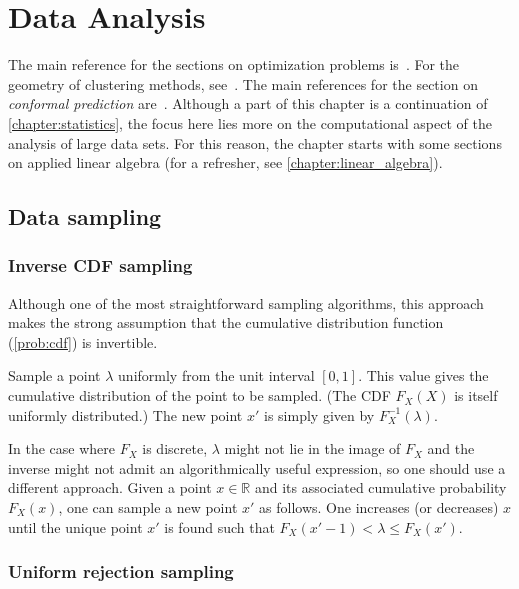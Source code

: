\chapter{Data Analysis}

    The main reference for the sections on optimization problems is~\citet{shewchuk_introduction_1994}. For the geometry of clustering methods, see~\citet{boissonnat_bregman_2010}. The main references for the section on \textit{conformal prediction} are~\citet{shafer_tutorial_2008,vovk_algorithmic_2005}. Although a part of this chapter is a continuation of \cref{chapter:statistics}, the focus here lies more on the computational aspect of the analysis of large data sets. For this reason, the chapter starts with some sections on applied linear algebra (for a refresher, see \cref{chapter:linear_algebra}).

\section{Data sampling}
\subsection{Inverse CDF sampling}

    Although one of the most straightforward sampling algorithms, this approach makes the strong assumption that the cumulative distribution function (\cref{prob:cdf}) is invertible.

    \begin{method}
        Sample a point $\lambda$ uniformly from the unit interval $[0,1]$. This value gives the cumulative distribution of the point to be sampled. (The CDF $F_X(X)$ is itself uniformly distributed.) The new point $x'$ is simply given by $F^{-1}_X(\lambda)$.

        In the case where $F_X$ is discrete, $\lambda$ might not lie in the image of $F_X$ and the inverse might not admit an algorithmically useful expression, so one should use a different approach. Given a point $x\in\mathbb{R}$ and its associated cumulative probability $F_X(x)$, one can sample a new point $x'$ as follows. One increases (or decreases) $x$ until the unique point $x'$ is found such that $F_X(x'-1)<\lambda\leq F_X(x')$.
    \end{method}

\subsection{Uniform rejection sampling}

